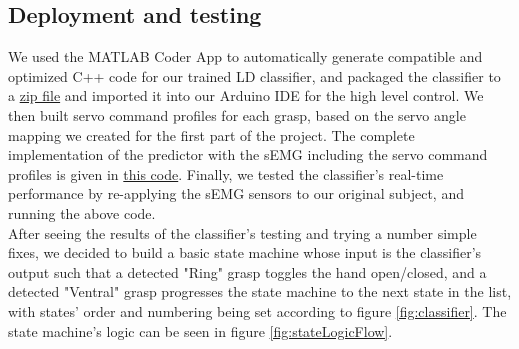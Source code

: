 \documentclass[10pt]{article}
\begin{document}





\subsection{Deployment and testing}
We used the MATLAB Coder App to automatically generate compatible and optimized C++ code for our trained LD classifier, and packaged the classifier to a \href{https://github.com/eladsimantov/Wearable-Robotics/blob/main/Final%20Project/predictGraspLD_pkg.zip}{zip file} and imported it into our Arduino IDE for the high level control. We then built servo command profiles for each grasp, based on the servo angle mapping we created for the first part of the project. The complete implementation of the predictor with the sEMG including the servo command profiles is given in \href{https://github.com/eladsimantov/Wearable-Robotics/blob/main/Final%20Project/classificationImplementation.ino}{this code}. 
Finally, we tested the classifier's real-time performance by re-applying the sEMG sensors to our original subject, and running the above code.\\
After seeing the results of the classifier's testing and trying a number simple fixes, we decided to build a basic state machine whose input is the classifier's output such that a detected "Ring" grasp toggles the hand open/closed, and a detected "Ventral" grasp progresses the state machine to the next state in the list, with states' order and numbering being set according to figure \ref{fig:classifier}. The state machine's logic can be seen in figure \ref{fig:stateLogicFlow}.
\end{document}
